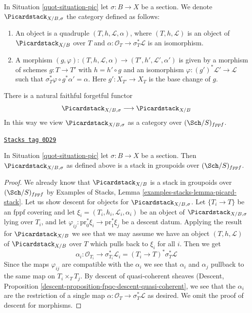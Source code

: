 In Situation \ref{quot-situation-pic} let $\sigma : B \to X$ be a section.
We denote $\Picardstack_{X/B, \sigma}$ the category defined as follows:
\begin{enumerate}
\item An object is a quadruple $(T, h, \mathcal{L}, \alpha)$, where
$(T, h, \mathcal{L})$ is an object of $\Picardstack_{X/B}$ over $T$ and
$\alpha : \mathcal{O}_T \to \sigma_T^*\mathcal{L}$
is an isomorphism.
\item A morphism $(g, \varphi) : (T, h, \mathcal{L}, \alpha)
\to (T', h', \mathcal{L}', \alpha')$
is given by a morphism of schemes $g : T \to T'$ with $h = h' \circ g$
and an isomorphism $\varphi : (g')^*\mathcal{L}' \to \mathcal{L}$
such that $\sigma_T^*\varphi \circ g^*\alpha' = \alpha$.
Here $g' : X_{T'} \to X_T$ is the base change of $g$.
\end{enumerate}
There is a natural faithful forgetful functor
$$
\Picardstack_{X/B, \sigma} \longrightarrow
\Picardstack_{X/B}
$$
In this way we view $\Picardstack_{X/B, \sigma}$ as a category
over $(\Sch/S)_{fppf}$.

\begin{lemma}
\label{quot-lemma-pic-with-section-stack}
\href{https://stacks.math.columbia.edu/tag/0D29}{\texttt{Stacks tag 0D29}}

In Situation \ref{quot-situation-pic} let $\sigma : B \to X$ be a section.
Then $\Picardstack_{X/B, \sigma}$ as defined above is a stack in
groupoids over $(\Sch/S)_{fppf}$.
\end{lemma}

\begin{proof}
We already know that $\Picardstack_{X/B}$ is a stack in groupoids
over $(\Sch/S)_{fppf}$ by
Examples of Stacks, Lemma \ref{examples-stacks-lemma-picard-stack}.
Let us show descent for objects for $\Picardstack_{X/B, \sigma}$.
Let $\{T_i \to T\}$ be an fppf covering and let
$\xi_i = (T_i, h_i, \mathcal{L}_i, \alpha_i)$ be an object of
$\Picardstack_{X/B, \sigma}$ lying over $T_i$, and let
$\varphi_{ij} : \text{pr}_0^*\xi_i \to \text{pr}_1^*\xi_j$
be a descent datum. Applying the result for $\Picardstack_{X/B}$
we see that we may assume we have an object $(T, h, \mathcal{L})$
of $\Picardstack_{X/B}$ over $T$ which pulls back to $\xi_i$ for all $i$.
Then we get
$$
\alpha_i : \mathcal{O}_{T_i} \to \sigma_{T_i}^*\mathcal{L}_i =
(T_i \to T)^*\sigma_T^*\mathcal{L}
$$
Since the maps $\varphi_{ij}$ are compatible with the $\alpha_i$
we see that $\alpha_i$ and $\alpha_j$ pullback to the same map
on $T_i \times_T T_j$. By descent of quasi-coherent sheaves
(Descent, Proposition \ref{descent-proposition-fpqc-descent-quasi-coherent},
we see that the $\alpha_i$ are the restriction of a single map
$\alpha : \mathcal{O}_T \to \sigma_T^*\mathcal{L}$ as desired.
We omit the proof of descent for morphisms.
\end{proof}

